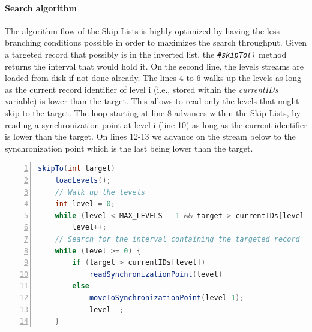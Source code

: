 \paragraph{Search algorithm}

The algorithm flow of the Skip Lists is highly optimized by having the less
branching conditions possible in order to maximizes the search throughput.
Given a targeted record that possibly is in the inverted list, the
\emph{\texttt{\#skipTo()}} method returns the interval that would hold it. On
the second line, the levels streams are loaded from disk if not done already.
The lines 4 to 6 walks up the levels as long as the current record identifier
of level i (i.e., stored within the \emph{currentIDs} variable) is lower than
the target. This allows to read only the levels that might skip to the target.
The loop starting at line 8 advances within the Skip Lists, by reading a
synchronization point at level i (line 10) as long as the current identifier is
lower than the target. On lines 12-13 we advance on the stream below to the
synchronization point which is the last being lower than the target.

\vspace{1em}
\begin{lstlisting}[frame=lines,language=Java,numbers=left,caption=Implementation of
the Skip Lists search
algorithm,label=lst:skiplists-search-algo,emph={currentIDs,moveToSynchronizationPoint,readSynchronizationPoint},
emphstyle={\bfseries}]
skipTo(int target)
	loadLevels();
	// Walk up the levels
	int level = 0;
	while (level < MAX_LEVELS - 1 && target > currentIDs[level + 1])
		level++;
	// Search for the interval containing the targeted record
	while (level >= 0) {
		if (target > currentIDs[level])
			readSynchronizationPoint(level)
		else
			moveToSynchronizationPoint(level-1);
			level--;
	}
\end{lstlisting}
